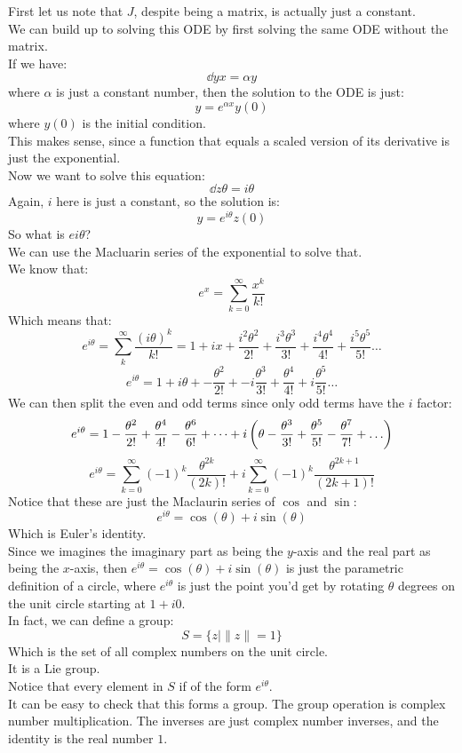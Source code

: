 \documentclass[12pt]{article}
\begin{document}
First let us note that $J$,
despite being a matrix, is actually
just a constant. \\
We can build up to solving this ODE
by first solving the same ODE without
the matrix. \\

If we have:
\[ \dd{y}{x} = \alpha y \]
where $\alpha$ is just a constant number,
then the solution to the ODE is just:
\[ y = e^{\alpha x}y(0) \]
where $y(0)$ is the initial condition. \\
This makes sense, since a function
that equals a scaled version of its derivative
is just the exponential. \\

Now we want to solve this equation:
\[ \dd{z}{\theta} = i \theta \]
Again, $i$ here is just a constant,
so the solution is:
\[ y = e^{i\theta}z(0) \]
So what is $e{i\theta}$? \\

We can use the Macluarin series of the
exponential to solve that. \\
We know that:
\[ e^x = \sum_{k = 0}^{\infty} \dfrac{x^k}{k!} \]
Which means that:
\[ e^{i\theta} = \sum_{k}^{\infty} 
\dfrac{(i\theta)^k}{k!} 
= 1 + ix + \dfrac{i^2\theta^2}{2!}
+ \dfrac{i^3\theta^3}{3!} + \dfrac{i^4\theta^4}{4!}
+ \dfrac{i^5\theta^5}{5!} \dots \]
\[ e^{i\theta}
= 1 + i\theta + -\dfrac{\theta^2}{2!}
+ -i\dfrac{\theta^3}{3!} + \dfrac{\theta^4}{4!}
+ i\dfrac{\theta^5}{5!} \dots \]
We can then split the even and odd
terms since only odd terms have the $i$ factor:
\[ e^{i\theta}
= 1 -\dfrac{\theta^2}{2!}
+ \dfrac{\theta^4}{4!} - \dfrac{\theta^6}{6!} + \dots
+ i \para{\theta - \dfrac{\theta^3}{3!}
+ \dfrac{\theta^5}{5!} - \dfrac{\theta^7}{7!} + \dots} \]
\[ e^{i\theta}
= \sum_{k = 0}^{\infty}
(-1)^{k}\dfrac{\theta^{2k}}{(2k)!}
+ i\sum_{k = 0}^{\infty} (-1)^{k}
\dfrac{\theta^{2k + 1}}{(2k + 1)!} \]
Notice that these are just the Maclaurin
series of $\cos$ and $\sin$:
\[ e^{i\theta} = \cos(\theta) + i\sin(\theta) \]
Which is Euler's identity. \\

Since we imagines the imaginary part as being
the $y$-axis and the real part as being
the $x$-axis,
then $e^{i\theta} = \cos(\theta) + i\sin(\theta)$
is just the parametric definition of a circle,
where $e^{i\theta}$ is just the point
you'd get by rotating $\theta$ degrees
on the unit circle starting at $1 + i0$. \\

In fact, we can define a group:
\[ S = \{ z \mid \|z\| = 1 \} \]
Which is the set of all complex numbers
on the unit circle. \\
It is a Lie group. \\
Notice that every element
in $S$ if of the form $e^{i\theta}$. \\
It can be easy to check that this forms a group.
The group operation is complex number multiplication.
The inverses are just complex number inverses,
and the identity is the real number $1$. \\
\end{document}
